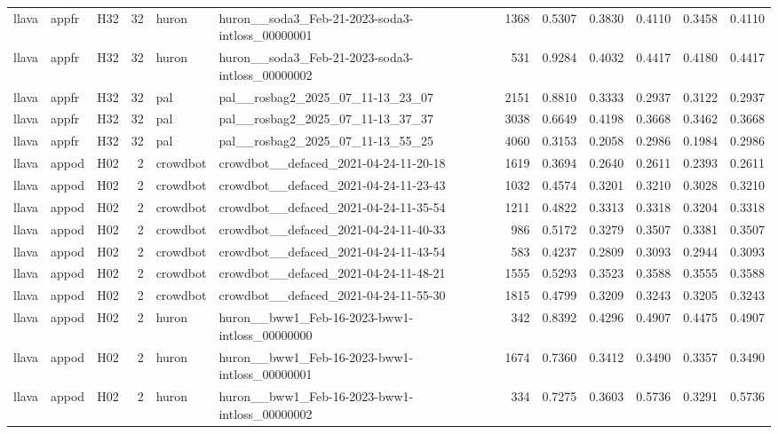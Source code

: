 \begin{table}[tbp]
\begin{tabular}{lllrllrrrrrr}
llava & appfr & H32 & 32 & huron & huron\_\_soda3\_Feb-21-2023-soda3-intloss\_00000001 & 1368 & 0.5307 & 0.3830 & 0.4110 & 0.3458 & 0.4110 \\
llava & appfr & H32 & 32 & huron & huron\_\_soda3\_Feb-21-2023-soda3-intloss\_00000002 & 531 & 0.9284 & 0.4032 & 0.4417 & 0.4180 & 0.4417 \\
llava & appfr & H32 & 32 & pal & pal\_\_rosbag2\_2025\_07\_11-13\_23\_07 & 2151 & 0.8810 & 0.3333 & 0.2937 & 0.3122 & 0.2937 \\
llava & appfr & H32 & 32 & pal & pal\_\_rosbag2\_2025\_07\_11-13\_37\_37 & 3038 & 0.6649 & 0.4198 & 0.3668 & 0.3462 & 0.3668 \\
llava & appfr & H32 & 32 & pal & pal\_\_rosbag2\_2025\_07\_11-13\_55\_25 & 4060 & 0.3153 & 0.2058 & 0.2986 & 0.1984 & 0.2986 \\
llava & appod & H02 & 2 & crowdbot & crowdbot\_\_defaced\_2021-04-24-11-20-18 & 1619 & 0.3694 & 0.2640 & 0.2611 & 0.2393 & 0.2611 \\
llava & appod & H02 & 2 & crowdbot & crowdbot\_\_defaced\_2021-04-24-11-23-43 & 1032 & 0.4574 & 0.3201 & 0.3210 & 0.3028 & 0.3210 \\
llava & appod & H02 & 2 & crowdbot & crowdbot\_\_defaced\_2021-04-24-11-35-54 & 1211 & 0.4822 & 0.3313 & 0.3318 & 0.3204 & 0.3318 \\
llava & appod & H02 & 2 & crowdbot & crowdbot\_\_defaced\_2021-04-24-11-40-33 & 986 & 0.5172 & 0.3279 & 0.3507 & 0.3381 & 0.3507 \\
llava & appod & H02 & 2 & crowdbot & crowdbot\_\_defaced\_2021-04-24-11-43-54 & 583 & 0.4237 & 0.2809 & 0.3093 & 0.2944 & 0.3093 \\
llava & appod & H02 & 2 & crowdbot & crowdbot\_\_defaced\_2021-04-24-11-48-21 & 1555 & 0.5293 & 0.3523 & 0.3588 & 0.3555 & 0.3588 \\
llava & appod & H02 & 2 & crowdbot & crowdbot\_\_defaced\_2021-04-24-11-55-30 & 1815 & 0.4799 & 0.3209 & 0.3243 & 0.3205 & 0.3243 \\
llava & appod & H02 & 2 & huron & huron\_\_bww1\_Feb-16-2023-bww1-intloss\_00000000 & 342 & 0.8392 & 0.4296 & 0.4907 & 0.4475 & 0.4907 \\
llava & appod & H02 & 2 & huron & huron\_\_bww1\_Feb-16-2023-bww1-intloss\_00000001 & 1674 & 0.7360 & 0.3412 & 0.3490 & 0.3357 & 0.3490 \\
llava & appod & H02 & 2 & huron & huron\_\_bww1\_Feb-16-2023-bww1-intloss\_00000002 & 334 & 0.7275 & 0.3603 & 0.5736 & 0.3291 & 0.5736 \\

\end{tabular}
\end{table}

